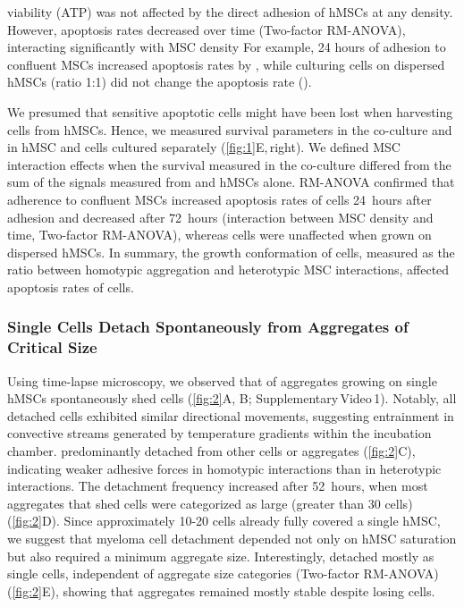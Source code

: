 \vspace{-.3cm}

\INA viability (ATP) was not affected by the direct adhesion of hMSCs at any
density. However, apoptosis rates decreased over time
 (Two-factor RM-ANOVA),
interacting significantly with MSC density
 For example, 24 hours of
adhesion to confluent MSCs increased apoptosis rates by
, while culturing \INA cells on dispersed hMSCs
(ratio 1:1) did not change the apoptosis rate ().


We presumed that sensitive apoptotic cells might have been lost when harvesting
\INA cells from hMSCs. Hence, we measured survival parameters in the co-culture
and in hMSC and \INA cells cultured separately (\autoref{fig:1}E,\,right). We
defined MSC interaction effects when the survival measured in the co-culture
differed from the sum of the signals measured from \INA and hMSCs alone.
RM-ANOVA confirmed that adherence to confluent MSCs increased apoptosis rates of
\INA cells \SI{24}{hours} after adhesion and decreased after \SI{72}{hours}
 (interaction between MSC
density and time, Two-factor RM-ANOVA), whereas \INA cells were unaffected when
grown on dispersed hMSCs.
In summary, the growth conformation of \INA cells, measured as the ratio between
homotypic aggregation and heterotypic MSC interactions, affected apoptosis rates
of \INA cells.




\subsubsection*{Single \INA Cells Detach Spontaneously from Aggregates of Critical Size}%
\label{C1:results_timelapse}%
Using time-lapse microscopy, we observed that  of
\INA aggregates growing on single hMSCs spontaneously shed \INA cells
(\autoref{fig:2}A, B; Supplementary\,Video\,1). Notably, all detached cells
exhibited similar directional movements, suggesting entrainment in convective
streams generated by temperature gradients within the incubation chamber. \INA
predominantly detached from other \INA cells or aggregates (\autoref{fig:2}C),
indicating weaker adhesive forces in homotypic interactions than in heterotypic
interactions. The detachment frequency increased after \SI{52}{hours}, when most
aggregates that shed \INA cells were categorized as large (greater than 30
cells) (\autoref{fig:2}D). Since approximately 10-20 \INA cells already fully
covered a single hMSC, we suggest that myeloma cell detachment depended not only
on hMSC saturation but also required a minimum aggregate size. Interestingly,
\INA detached mostly as single cells, independent of aggregate size categories
(Two-factor RM-ANOVA) (\autoref{fig:2}E),
showing that aggregates remained mostly stable despite losing cells.


